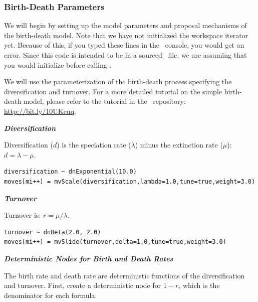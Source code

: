 
\subsubsection{Birth-Death Parameters}

We will begin by setting up the model parameters and proposal mechanisms of the birth-death model. 
Note that we have not initialized the workspace iterator  yet. 
Because of this, if you typed these lines in the \RevBayes~console, you would get an error. 
Since this code is intended to be in a sourced \Rev~file, we are assuming that you would initialize  before calling .

We will use the parameterization of the birth-death process specifying the diversification and turnover.
For a more detailed tutorial on the simple birth-death model, please refer to the tutorial in the \RevBayes~repository: \href{http://bit.ly/10UKeuq}{http://bit.ly/10UKeuq}.

\textbf{\textit{Diversification}}

Diversification ($d$) is the speciation rate ($\lambda$) minus the extinction rate ($\mu$): $d = \lambda - \mu$.
{\tt \begin{snugshade*}
\begin{lstlisting}
diversification ~ dnExponential(10.0) 
moves[mi++] = mvScale(diversification,lambda=1.0,tune=true,weight=3.0)
\end{lstlisting}
\end{snugshade*}}

\textbf{\textit{Turnover}}

Turnover is: $r = \mu / \lambda$.
{\tt \begin{snugshade*}
\begin{lstlisting}
turnover ~ dnBeta(2.0, 2.0) 
moves[mi++] = mvSlide(turnover,delta=1.0,tune=true,weight=3.0)
\end{lstlisting}
\end{snugshade*}}

\textbf{\textit{Deterministic Nodes for Birth and Death Rates}}

The birth rate and death rate are deterministic functions of the diversification and turnover.
First, create a deterministic node for $1 - r$, which is the denominator for each formula.

